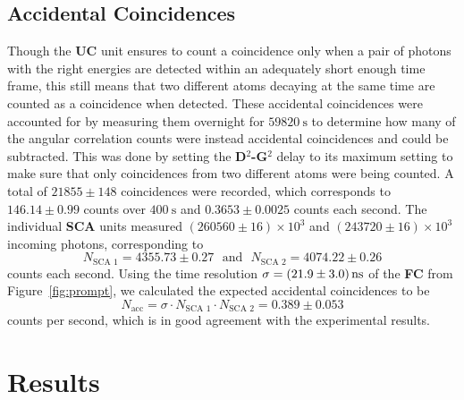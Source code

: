 \documentclass[twocolumn]{article}
\begin{document}
\subsection{Accidental Coincidences} \label{sec:acc}
Though the \textbf{UC} unit ensures to count a coincidence only when a pair of photons with the right energies are detected within an adequately short enough time frame, this still means that two different atoms decaying at the same time are counted as a coincidence when detected. These accidental coincidences were accounted for by measuring them overnight for $\SI{59820}{\second}$ to determine how many of the angular correlation counts were instead accidental coincidences and could be subtracted. This was done by setting the \textbf{D$^2$-G$^2$} delay to its maximum setting to make sure that only coincidences from two different atoms were being counted. A total of $21855 \pm 148$ coincidences were recorded, which corresponds to $146.14 \pm 0.99$ counts over $\SI{400}{\second}$ and $0.3653 \pm 0.0025$ counts each second. The individual \textbf{SCA} units measured $(260560 \pm 16)\times 10^3$ and $(243720 \pm 16)\times 10^3$ incoming photons, corresponding to
 \begin{equation}
 N_{\text{SCA 1}} = 4355.73 \pm 0.27 \hspace{8pt} \text{and} \hspace{8pt} N_{\text{SCA 2}} =  4074.22 \pm 0.26 \nonumber
 \end{equation}
 counts each second. Using the time resolution $\sigma = \SI[separate-uncertainty = true]{21.9 \pm 3.0}{\nano \second}$ of the \textbf{FC} from Figure~\ref{fig:prompt}, we calculated the expected accidental coincidences to be\cite{leo}
\begin{equation}
N_{\text{acc}} = \sigma \cdot N_{\text{SCA 1}} \cdot N_{\text{SCA 2}} = 0.389 \pm 0.053 \nonumber
\end{equation}
counts per second, which is in good agreement with the experimental results.

\section{Results}
\end{document}
